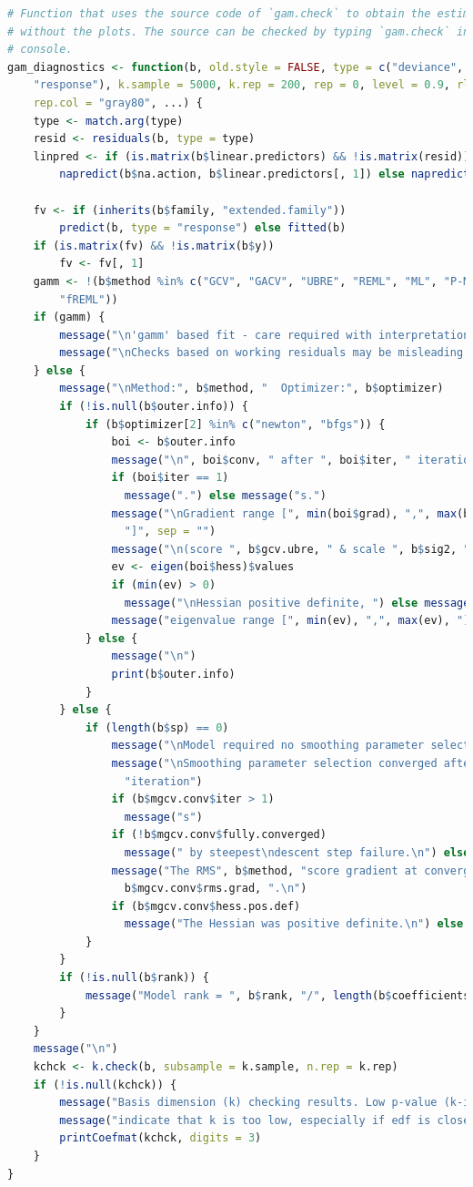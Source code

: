 \documentclass[
]{article}
\begin{document}
\begin{lstlisting}[language=R]
# Function that uses the source code of `gam.check` to obtain the estimates
# without the plots. The source can be checked by typing `gam.check` in the
# console.
gam_diagnostics <- function(b, old.style = FALSE, type = c("deviance", "pearson",
    "response"), k.sample = 5000, k.rep = 200, rep = 0, level = 0.9, rl.col = 2,
    rep.col = "gray80", ...) {
    type <- match.arg(type)
    resid <- residuals(b, type = type)
    linpred <- if (is.matrix(b$linear.predictors) && !is.matrix(resid))
        napredict(b$na.action, b$linear.predictors[, 1]) else napredict(b$na.action, b$linear.predictors)

    fv <- if (inherits(b$family, "extended.family"))
        predict(b, type = "response") else fitted(b)
    if (is.matrix(fv) && !is.matrix(b$y))
        fv <- fv[, 1]
    gamm <- !(b$method %in% c("GCV", "GACV", "UBRE", "REML", "ML", "P-ML", "P-REML",
        "fREML"))
    if (gamm) {
        message("\n'gamm' based fit - care required with interpretation.")
        message("\nChecks based on working residuals may be misleading.")
    } else {
        message("\nMethod:", b$method, "  Optimizer:", b$optimizer)
        if (!is.null(b$outer.info)) {
            if (b$optimizer[2] %in% c("newton", "bfgs")) {
                boi <- b$outer.info
                message("\n", boi$conv, " after ", boi$iter, " iteration", sep = "")
                if (boi$iter == 1)
                  message(".") else message("s.")
                message("\nGradient range [", min(boi$grad), ",", max(boi$grad),
                  "]", sep = "")
                message("\n(score ", b$gcv.ubre, " & scale ", b$sig2, ").", sep = "")
                ev <- eigen(boi$hess)$values
                if (min(ev) > 0)
                  message("\nHessian positive definite, ") else message("\n")
                message("eigenvalue range [", min(ev), ",", max(ev), "].\n", sep = "")
            } else {
                message("\n")
                print(b$outer.info)
            }
        } else {
            if (length(b$sp) == 0)
                message("\nModel required no smoothing parameter selection") else {
                message("\nSmoothing parameter selection converged after", b$mgcv.conv$iter,
                  "iteration")
                if (b$mgcv.conv$iter > 1)
                  message("s")
                if (!b$mgcv.conv$fully.converged)
                  message(" by steepest\ndescent step failure.\n") else message(".\n")
                message("The RMS", b$method, "score gradient at convergence was",
                  b$mgcv.conv$rms.grad, ".\n")
                if (b$mgcv.conv$hess.pos.def)
                  message("The Hessian was positive definite.\n") else message("The Hessian was not positive definite.\n")
            }
        }
        if (!is.null(b$rank)) {
            message("Model rank = ", b$rank, "/", length(b$coefficients), "\n")
        }
    }
    message("\n")
    kchck <- k.check(b, subsample = k.sample, n.rep = k.rep)
    if (!is.null(kchck)) {
        message("Basis dimension (k) checking results. Low p-value (k-index<1) may\n")
        message("indicate that k is too low, especially if edf is close to k'.\n\n")
        printCoefmat(kchck, digits = 3)
    }
}
\end{lstlisting}
\end{document}
